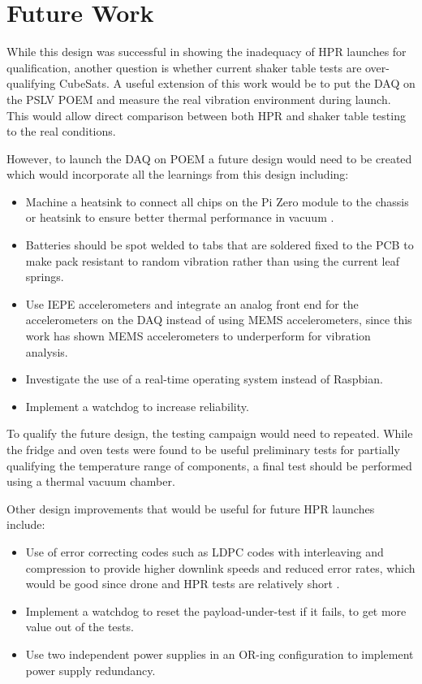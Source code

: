 \documentclass{report}
\begin{document}
\section{Future Work}

While this design was successful in showing the inadequacy of HPR launches for qualification, another question is whether current shaker table tests are over-qualifying CubeSats. A useful extension of this work would be to put the DAQ on the PSLV POEM and measure the real vibration environment during launch. This would allow direct comparison between both HPR and shaker table testing to the real conditions.

However, to launch the DAQ on POEM a future design would need to be created which would incorporate all the learnings from this design including:

\begin{itemize}
  \item Machine a heatsink to connect all chips on the Pi Zero module to the chassis or heatsink to ensure better thermal performance in vacuum \cite{guertin2022raspberry}.
  \item Batteries should be spot welded to tabs that are soldered fixed to the PCB to make pack resistant to random vibration rather than using the current leaf springs.
  \item Use IEPE accelerometers and integrate an analog front end for the accelerometers on the DAQ instead of using MEMS accelerometers, since this work has shown MEMS accelerometers to underperform for vibration analysis.
  \item Investigate the use of a real-time operating system instead of Raspbian.
  \item Implement a watchdog to increase reliability.
\end{itemize}

To qualify the future design, the testing campaign would need to repeated. While the fridge and oven tests were found to be useful preliminary tests for partially qualifying the temperature range of components, a final test should be performed using a thermal vacuum chamber.

Other design improvements that would be useful for future HPR launches include:
\begin{itemize}
  \item Use of error correcting codes such as LDPC codes with interleaving and compression to provide higher downlink speeds and reduced error rates, which would be good since drone and HPR tests are relatively short \cite{sonali2021capacity}.
  \item Implement a watchdog to reset the payload-under-test if it fails, to get more value out of the tests.
  \item Use two independent power supplies in an OR-ing configuration to implement power supply redundancy.
\end{itemize}
\end{document}
